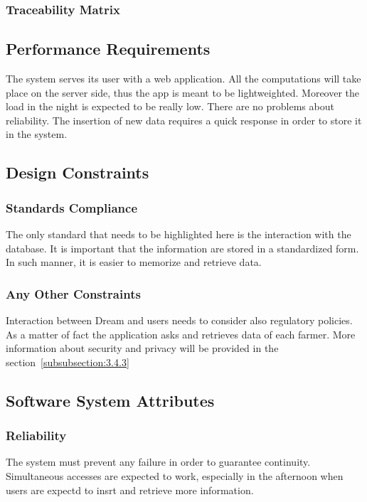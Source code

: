 


\subsubsection{Traceability Matrix}
\subsection{Performance Requirements}
The system serves its user with a web application. All the computations will take place on the server side, 
thus the app is meant to be lightweighted. Moreover the load in the night is expected to be really low.
There are no problems about reliability. The insertion of new data requires a quick response in order to store 
it in the system.

\subsection{Design Constraints}
\subsubsection{Standards Compliance}
The only standard that needs to be highlighted here is the interaction with the database. It is important that the information are stored 
in a standardized form. In such manner, it is easier to memorize and retrieve data.


\subsubsection{Any Other Constraints}
Interaction between Dream and users needs to consider also regulatory policies.
As a matter of fact the application asks and retrieves data of each farmer.
More information about security and privacy will be provided in the section~\ref{subsubsection:3.4.3}


\subsection{Software System Attributes}

\subsubsection{Reliability}
The system must prevent any failure in order to guarantee continuity. 
Simultaneous accesses are expected to work, especially in the afternoon when users are expectd to insrt and retrieve more information.

